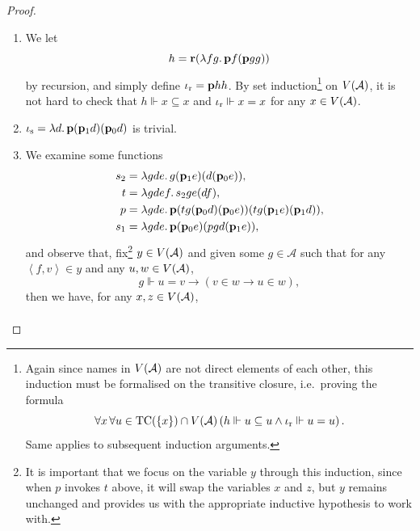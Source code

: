 \documentclass[12pt,openany]{book}
\theoremstyle{plain}
\theoremstyle{definition}
\newcommand\uplabel[1]{\textup{(#1)}}
\newcommand\tuple[1]{\left\langle #1 \right\rangle}
\newcommand\opA[1]{\mathop{\forall #1}}
\newcommand\oplam[1]{\mathop{\lambda #1.}}
\DeclareMathOperator\TC{TC}
\newcommand\bp{\mathbf{p}}
\newcommand\br{\mathbf{r}}
\newcommand\ior{\iota_\textup{r}}
\newcommand\ios{\iota_\textup{s}}
\begin{document}
\begin{proof}
  \begin{enumerate}[label=\uplabel{\roman*}]
    \item We let
          \[h = \br \mleft(\oplam{fg} \bp f \mleft(\bp gg\mright)\mright)\]
          by recursion, and simply define $\ior = \bp hh$. By set induction\footnote{Again since names in $V\mleft(\mathcal{A}\mright)$ are not direct elements of each other, this induction must be formalised on the transitive closure, i.e.\ proving the formula
            \[\opA{x} \opA{u \in \TC\mleft(\left\{x\right\}\mright) \cap V\mleft(\mathcal{A}\mright)} \left(h \Vdash u \subseteq u \land \ior \Vdash u = u\right).\]
            Same applies to subsequent induction arguments.} on $V\mleft(\mathcal{A}\mright)$, it is not hard to check that $h \Vdash x \subseteq x$ and $\ior \Vdash x = x$ for any $x \in V\mleft(\mathcal{A}\mright)$.
    \item $\ios = \oplam{d} \bp \mleft(\bp_1 d\mright) \mleft(\bp_0 d\mright)$ is trivial.
    \item We examine some functions
          \begin{align*}
            s_2 & = \oplam{gde} g \mleft(\bp_1 e\mright) \mleft(d \mleft(\bp_0 e\mright)\mright),                                                                    \\
            t   & = \oplam{gdef} s_2 ge \mleft(df\mright),                                                                                                           \\
            p   & = \oplam{gde} \bp \mleft(tg \mleft(\bp_0 d\mright) \mleft(\bp_0 e\mright)\mright) \mleft(tg \mleft(\bp_1 e\mright) \mleft(\bp_1 d\mright)\mright), \\
            s_1 & = \oplam{gde} \bp \mleft(\bp_0 e\mright) \mleft(pgd \mleft(\bp_1 e\mright)\mright),
          \end{align*}
          and observe that, fix\footnote{It is important that we focus on the variable $y$ through this induction, since when $p$ invokes $t$ above, it will swap the variables $x$ and $z$, but $y$ remains unchanged and provides us with the appropriate inductive hypothesis to work with.} $y \in V\mleft(\mathcal{A}\mright)$ and given some $g \in \mathcal{A}$ such that for any $\tuple{f, v} \in y$ and any $u, w \in V\mleft(\mathcal{A}\mright)$,
          \[g \Vdash u = v \rightarrow \left(v \in w \rightarrow u \in w\right),\]
          then we have, for any $x, z \in V\mleft(\mathcal{A}\mright)$,
          \begin{align*}

\end{align*}
\end{enumerate}
\end{proof}
\end{document}
